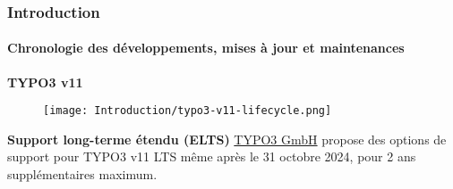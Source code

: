 %

\begin{frame}[fragile]
	\frametitle{Introduction}
	\framesubtitle{Chronologie des développements, mises à jour et maintenances}

	\textbf{TYPO3 v11}

	\begin{figure}
		\texttt{[image: Introduction/typo3-v11-lifecycle.png]}
	\end{figure}

	\textbf{Support long-terme étendu (ELTS)}\newline
	\smaller
		\href{https://typo3.com}{TYPO3 GmbH} propose des options de support
		pour TYPO3 v11 LTS même après le 31 octobre 2024, pour 2 ans supplémentaires
		maximum.
	\normalsize

\end{frame}

